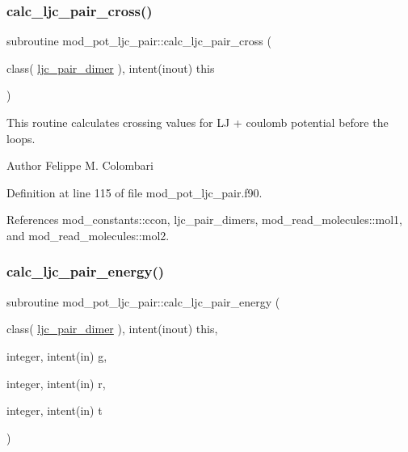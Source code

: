 \subsubsection{\texorpdfstring{calc\+\_\+ljc\+\_\+pair\+\_\+cross()}{calc\_ljc\_pair\_cross()}}
{\footnotesize\ttfamily subroutine mod\+\_\+pot\+\_\+ljc\+\_\+pair\+::calc\+\_\+ljc\+\_\+pair\+\_\+cross (\begin{DoxyParamCaption}\item[{class( \hyperlink{structmod__pot__ljc__pair_1_1ljc__pair__dimer}{ljc\+\_\+pair\+\_\+dimer} ), intent(inout)}]{this }\end{DoxyParamCaption})}



This routine calculates crossing values for LJ + coulomb potential before the loops. 

\begin{DoxyAuthor}{Author}
Felippe M. Colombari 
\end{DoxyAuthor}


Definition at line 115 of file mod\+\_\+pot\+\_\+ljc\+\_\+pair.\+f90.



References mod\+\_\+constants\+::ccon, ljc\+\_\+pair\+\_\+dimers, mod\+\_\+read\+\_\+molecules\+::mol1, and mod\+\_\+read\+\_\+molecules\+::mol2.

\mbox{\label{namespacemod__pot__ljc__pair_ad7983df6d805852c7c2eafd29a09c7a7}} 
\subsubsection{\texorpdfstring{calc\+\_\+ljc\+\_\+pair\+\_\+energy()}{calc\_ljc\_pair\_energy()}}
{\footnotesize\ttfamily subroutine mod\+\_\+pot\+\_\+ljc\+\_\+pair\+::calc\+\_\+ljc\+\_\+pair\+\_\+energy (\begin{DoxyParamCaption}\item[{class( \hyperlink{structmod__pot__ljc__pair_1_1ljc__pair__dimer}{ljc\+\_\+pair\+\_\+dimer} ), intent(inout)}]{this,  }\item[{integer, intent(in)}]{g,  }\item[{integer, intent(in)}]{r,  }\item[{integer, intent(in)}]{t }\end{DoxyParamCaption})}



